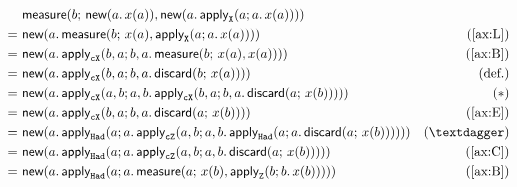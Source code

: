 \begin{align*}
     &\ \tmeasure{b}{\tnew{a}{x(a)}}{\tnew{a}{\tapply{X}{a}{x(a)}}}              &\\
    =&\ \tnew{a}{\tmeasure{b}{x(a)}{\tapply{X}{a}{x(a)}}}                        &(\ref{ax:L})\\
    =&\ \tnew{a}{\tapply{\ctl X}{b,a}{\tmeasure{b}{x(a)}{x(a)}}}                 &(\ref{ax:B})\\
    =&\ \tnew{a}{\tapply{\ctl X}{b,a}{\tdiscard{b}{x(a)}}}                       &(\text{def.})\\
    =&\ \tnew{a}{\tapply{\ctl X}{a,b}{\tapply{\ctl X}{b,a}{\tdiscard{a}{x(b)}}}} &(*)\\
    =&\ \tnew{a}{\tapply{\ctl X}{b,a}{\tdiscard{a}{x(b)}}}                       &(\ref{ax:E})\\
    =&\ \tnew{a}{\tapply{\had}{a}{\tapply{\ctl Z}{a,b}{\tapply{\had}{a}{\tdiscard{a}{x(b)}}}}}&(†)\\
    =&\ \tnew{a}{\tapply{\had}{a}{\tapply{\ctl Z}{a,b}{\tdiscard{a}{x(b)}}}}     &(\ref{ax:C})\\
    =&\ \tnew{a}{\tapply{\had}{a}{\tmeasure{a}{x(b)}{\tapply{Z}{b}{x(b)}}}}      &(\ref{ax:B})
\end{align*}

